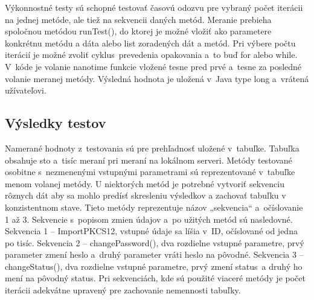 \documentclass[
  digital, %
  table,   %
oneside,
  nolof,     %
  nolot,     %
]{fithesis3}
\begin{document}
Výkonnostné testy sú schopné testovať časovú odozvu pre vybraný počet iterácii na jednej metóde, ale tiež na sekvencii daných metód. Meranie prebieha spoločnou metódou runTest(), do ktorej je možné vložiť ako parametere konkrétnu metódu a dáta alebo list zoradených dát a metód. Pri výbere počtu iterácií je možné zvoliť cyklus~prevedenia opakovania a~to buď for alebo while.  V~kóde je  volanie nanotime funkcie vložené tesne pred prvé a~tesne za posledné volanie meranej metódy. Výsledná hodnota je uložená v~Java type long a~vrátená užívateľovi.
\subsection{Výsledky testov}
Namerané hodnoty z~testovania sú pre prehľadnosť uložené v~tabuľke. Tabuľka obsahuje sto a~tisíc meraní pri meraní na lokálnom serveri. Metódy testované osobitne s~nezmenenými vstupnými parametrami sú reprezentované v~tabuľke menom volanej metódy. U niektorých metód je potrebné vytvoriť sekvenciu rôznych dát aby sa mohlo predísť skresleniu výsledkov a zachovať tabuľku v konzistentnom stave. Tieto metódy reprezentuje názov „sekvencia“ a~očíslovanie 1 až 3. Sekvencie s~popisom zmien údajov  a~po užitých metód sú nasledovné.
Sekvencia 1 – ImportPKCS12, vstupné údaje sa líšia v~ID, očíslované od jedna po tisíc.
Sekvencia 2 – changePassword(), dva rozdielne vstupné parametre, prvý parameter zmení heslo  a~druhý parameter vráti heslo na pôvodné.
Sekvencia 3 – changeStatus(), dva rozdielne vstupné parametre, prvý zmení status~a druhý ho mení na pôvodný status. 
Pri sekvenciách, kde sú použité viaceré metódy je počet iterácii adekvátne upravený pre zachovanie nemennosti tabuľky. 
\begin{table}[htbp]
	\begin{center}
	\end{center}
	\caption{Ukážka nameraných hodnôt}
	\label{table:power}
\end{table}
\end{document}
